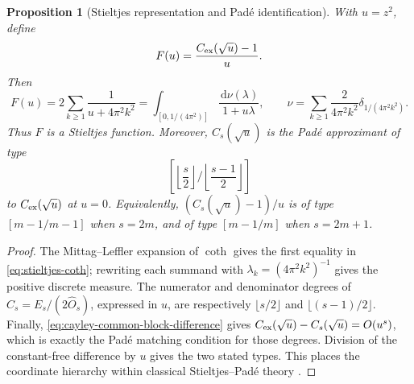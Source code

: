 \documentclass[11pt,a4paper]{article}
\newtheorem{proposition}[theorem]{Proposition}
\newcommand{\dd}{\,\mathrm d}
\begin{document}
\begin{proposition}[Stieltjes representation and Pad\'e identification]
\label{prop:stieltjes-pade-coordinate}
With \(u=z^2\), define
\[
 F(u)=\frac{C_{\rm ex}(\sqrt u)-1}{u}.
\]
Then
\begin{equation}\label{eq:stieltjes-coth}
 F(u)=2\sum_{k\ge1}\frac1{u+4\pi^2k^2}
 =\int_{[0,1/(4\pi^2)]}\frac{\dd\nu(\lambda)}{1+u\lambda},
 \qquad
 \nu=\sum_{k\ge1}\frac{2}{4\pi^2k^2}
       \delta_{1/(4\pi^2k^2)}.
\end{equation}
Thus \(F\) is a Stieltjes function.  Moreover,
\(C_s(\sqrt u)\) is the Pad\'e approximant of type
\[
 \left[\left\lfloor\frac s2\right\rfloor
 \Big/\left\lfloor\frac{s-1}{2}\right\rfloor\right]
\]
to \(C_{\rm ex}(\sqrt u)\) at \(u=0\).  Equivalently,
\((C_s(\sqrt u)-1)/u\) is of type \([m-1/m-1]\) when \(s=2m\), and
of type \([m-1/m]\) when \(s=2m+1\).
\end{proposition}

\begin{proof}
The Mittag--Leffler expansion of \(\coth\) gives the first equality in
\cref{eq:stieltjes-coth}; rewriting each summand with
\(\lambda_k=(4\pi^2k^2)^{-1}\) gives the positive discrete measure.
The numerator and denominator degrees of
\(C_s=E_s/(2\widehat O_s)\), expressed in \(u\), are respectively
\(\lfloor s/2\rfloor\) and \(\lfloor(s-1)/2\rfloor\).  Finally,
\cref{eq:cayley-common-block-difference} gives
\(C_{\rm ex}(\sqrt u)-C_s(\sqrt u)=O(u^s)\), which is exactly the Pad\'e
matching condition for those degrees.  Division of the constant-free
difference by \(u\) gives the two stated types.  This places the coordinate
hierarchy within classical Stieltjes--Pad\'e theory
\cite{wynn1968}.
\end{proof}
\end{document}
